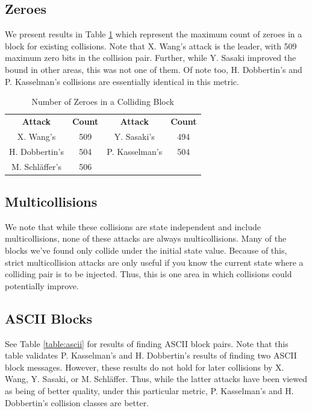 \documentclass[conference]{IEEEtran}
\begin{document}
\subsection{Zeroes}

We present results in Table \ref{table:zeroes} which represent the maximum count of zeroes in a block
for existing collisions. Note that X. Wang's attack is the leader, with 509
maximum zero bits in the collision pair. Further, while Y. Sasaki improved
the bound in other areas, this was not one of them. Of note too,
H. Dobbertin's and P. Kasselman's collisions are essentially identical in
this metric.

\begin{table}
    \caption{Number of Zeroes in a Colliding Block}
    \label{table:zeroes}
    \begin{tabular}{c c c c}
        \textbf{Attack} & \textbf{Count} & \textbf{Attack} & \textbf{Count} \\
        X. Wang's & 509 & Y. Sasaki's & 494 \\
        H. Dobbertin's & 504 & P. Kasselman's & 504 \\
        M. Schl{\"a}ffer's & 506 & & \\
    \end{tabular}
\end{table}

\subsection{Multicollisions}

We note that while these collisions are state independent and include
multicollisions, none of these attacks are always multicollisions. Many of the
blocks we've found only collide under the initial state value. Because of this,
strict multicollision attacks are only useful if you know the current state where a
colliding pair is to be injected. Thus, this is one area in which collisions
could potentially improve.

\subsection{ASCII Blocks}

See Table \ref{table:ascii} for results of finding ASCII block pairs. Note that
this table validates P. Kasselman's and H. Dobbertin's results of finding
two ASCII block messages. However, these results do not hold for later
collisions by X. Wang, Y. Sasaki, or M. Schl{\"a}ffer. Thus, while the latter
attacks have been viewed as being of better quality, under this particular
metric, P. Kasselman's and H. Dobbertin's collision classes are better.
\end{document}
